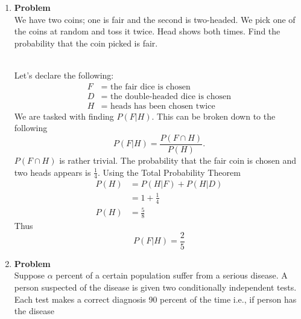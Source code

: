 \documentclass[12pt]{article}
\newenvironment{Ex}{\textbf{Problem}\vspace{.75em}\\}{}
\begin{document}
\begin{enumerate}
\item
  \begin{Ex}
    We have two coins; one is fair and the second is two-headed. We
    pick one of the coins at random and toss it twice. Head shows both
    times. Find the probability that the coin picked is fair.
    \begin{solution} \hfill \vspace{0.75em} \\
      Let's declare the following:
      \begin{equation}
        \label{eq:3-var-declaration}
        \begin{aligned}
          F &= \text{ the fair dice is chosen} \\
          D &= \text{ the double-headed dice is chosen} \\
          H &= \text{ heads has been chosen twice}
        \end{aligned}
      \end{equation}
      We are tasked with finding $P(F|H)$. This can be broken down to
      the following
      \begin{equation}
        \label{eq:3-enumeration}
        P(F|H) = \frac{P(F \cap H)}{P(H)}.
      \end{equation}
      $P(F \cap H)$ is rather trivial. The probability that the fair
      coin is chosen and two heads appears is $\frac{1}{4}$. Using the
      Total Probability Theorem
      \begin{equation}
        \label{eq:3-total-probability}
        \begin{aligned}
          P(H) &= P(H|F) + P(H|D) \\
          &= 1 + \frac{1}{4} \\
          P(H) &= \frac{5}{8}
        \end{aligned}
      \end{equation}
      Thus
      \begin{equation}
        \label{eq:3-solution}
        P(F|H) = \frac{2}{5}
      \end{equation}
    \end{solution}
  \end{Ex}
\item
  \begin{Ex}
    Suppose $\alpha$ percent of a certain population suffer from a
    serious disease. A person suspected of the disease is given two
    conditionally independent tests. Each test makes a correct
    diagnosis 90 percent of the time i.e., if person has the disease

\end{Ex}
\end{enumerate}
\end{document}
